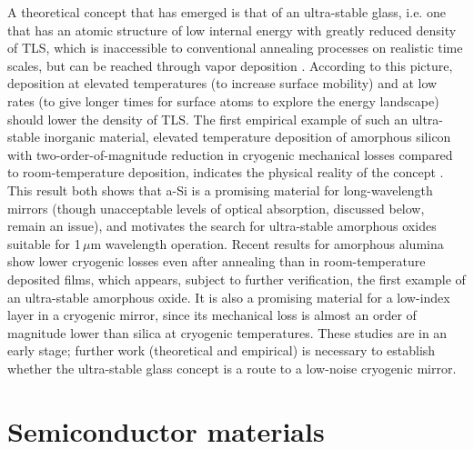 A theoretical concept that has emerged is that of an ultra-stable glass, i.e. one that has an atomic structure of low internal energy with greatly reduced density of TLS, which is inaccessible to conventional annealing processes on realistic time scales, but can be reached through vapor deposition \cite{singh2013ultrastable}. According to this picture, deposition at elevated temperatures (to increase surface mobility) and at low rates (to give longer times for surface atoms to explore the energy landscape) should lower the density of TLS. The first empirical example of such an ultra-stable inorganic material, elevated temperature deposition of amorphous silicon with two-order-of-magnitude reduction in cryogenic mechanical losses compared to room-temperature deposition, indicates the physical reality of the concept \cite{liu2014hydrogen}. This result both shows that a-Si is a promising material for long-wavelength mirrors (though unacceptable levels of optical absorption, discussed below, remain an issue), and motivates the search for ultra-stable amorphous oxides suitable for 1\,$\mu$m wavelength operation. Recent results for amorphous alumina show lower cryogenic losses even after annealing than in room-temperature deposited films, which appears, subject to further verification, the first example of an ultra-stable amorphous oxide. It is also a promising material for a low-index layer in a cryogenic mirror, since its mechanical loss is almost an order of magnitude lower than silica at cryogenic temperatures. These studies are in an early stage; further work (theoretical and empirical) is necessary to establish whether the ultra-stable glass concept is a route to a low-noise cryogenic mirror.  

\section{Semiconductor materials}


